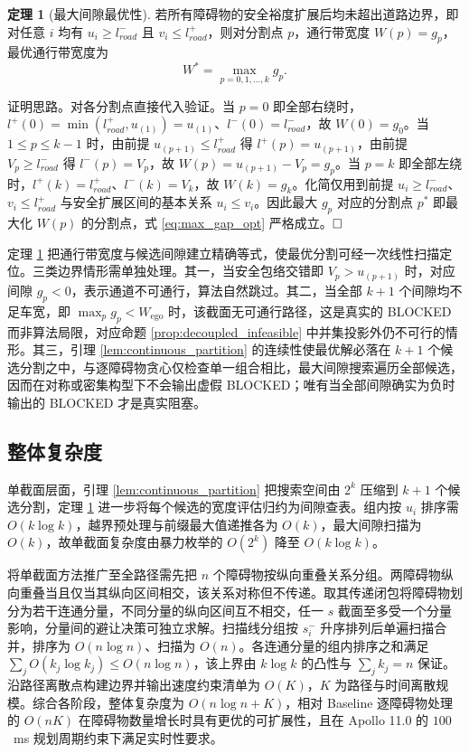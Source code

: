 \documentclass[a4paper,11pt]{ctexart}
\theoremstyle{definition}
\newtheorem{theorem}{定理}[section]
\begin{document}
\begin{theorem}[最大间隙最优性]
\label{thm:max_gap}
若所有障碍物的安全裕度扩展后均未超出道路边界，即对任意 $i$ 均有 $u_i \geq l_{road}^{-}$ 且 $v_i \leq l_{road}^{+}$，则对分割点 $p$，通行带宽度 $W(p) = g_p$，最优通行带宽度为
\begin{equation}
    W^{*} = \max_{p = 0, 1, \ldots, k} g_p.
    \label{eq:max_gap_opt}
\end{equation}
\end{theorem}

证明思路。对各分割点直接代入验证。当 $p = 0$ 即全部右绕时，$l^{+}(0) = \min(l_{road}^{+}, u_{(1)}) = u_{(1)}$、$l^{-}(0) = l_{road}^{-}$，故 $W(0) = g_0$。当 $1 \leq p \leq k-1$ 时，由前提 $u_{(p+1)} \leq l_{road}^{+}$ 得 $l^{+}(p) = u_{(p+1)}$，由前提 $V_p \geq l_{road}^{-}$ 得 $l^{-}(p) = V_p$，故 $W(p) = u_{(p+1)} - V_p = g_p$。当 $p = k$ 即全部左绕时，$l^{+}(k) = l_{road}^{+}$、$l^{-}(k) = V_k$，故 $W(k) = g_k$。化简仅用到前提 $u_i \geq l_{road}^{-}$、$v_i \leq l_{road}^{+}$ 与安全扩展区间的基本关系 $u_i \leq v_i$。因此最大 $g_p$ 对应的分割点 $p^{*}$ 即最大化 $W(p)$ 的分割点，式 \eqref{eq:max_gap_opt} 严格成立。$\hfill\Box$

定理 \ref{thm:max_gap} 把通行带宽度与候选间隙建立精确等式，使最优分割可经一次线性扫描定位。三类边界情形需单独处理。其一，当安全包络交错即 $V_p > u_{(p+1)}$ 时，对应间隙 $g_p < 0$，表示通道不可通行，算法自然跳过。其二，当全部 $k+1$ 个间隙均不足车宽，即 $\max_p g_p < W_{\text{ego}}$ 时，该截面无可通行路径，这是真实的 BLOCKED 而非算法局限，对应命题 \ref{prop:decoupled_infeasible} 中并集投影外仍不可行的情形。其三，引理 \ref{lem:continuous_partition} 的连续性使最优解必落在 $k+1$ 个候选分割之中，与逐障碍物贪心仅检查单一组合相比，最大间隙搜索遍历全部候选，因而在对称或密集构型下不会输出虚假 BLOCKED；唯有当全部间隙确实为负时输出的 BLOCKED 才是真实阻塞。

\subsection{整体复杂度}
\label{sec:thy_complexity}

单截面层面，引理 \ref{lem:continuous_partition} 把搜索空间由 $2^k$ 压缩到 $k+1$ 个候选分割，定理 \ref{thm:max_gap} 进一步将每个候选的宽度评估归约为间隙查表。组内按 $u_i$ 排序需 $O(k \log k)$，越界预处理与前缀最大值递推各为 $O(k)$，最大间隙扫描为 $O(k)$，故单截面复杂度由暴力枚举的 $O(2^k)$ 降至 $O(k \log k)$。

将单截面方法推广至全路径需先把 $n$ 个障碍物按纵向重叠关系分组。两障碍物纵向重叠当且仅当其纵向区间相交，该关系对称但不传递。取其传递闭包将障碍物划分为若干连通分量，不同分量的纵向区间互不相交，任一 $s$ 截面至多受一个分量影响，分量间的避让决策可独立求解。扫描线分组按 $s_i^{-}$ 升序排列后单遍扫描合并，排序为 $O(n \log n)$、扫描为 $O(n)$。各连通分量的组内排序之和满足 $\sum_j O(k_j \log k_j) \leq O(n \log n)$，该上界由 $k \log k$ 的凸性与 $\sum_j k_j = n$ 保证。沿路径离散点构建边界并输出速度约束清单为 $O(K)$，$K$ 为路径与时间离散规模。综合各阶段，整体复杂度为 $O(n \log n + K)$，相对 Baseline 逐障碍物处理的 $O(nK)$ 在障碍物数量增长时具有更优的可扩展性，且在 Apollo 11.0 的 $100$~ms 规划周期约束下满足实时性要求。
\end{document}

